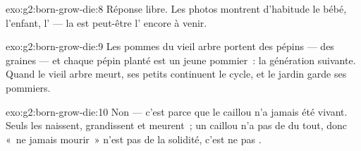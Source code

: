 \begin{solution}{exo:g2:born-grow-die:8}
Réponse libre. Les photos montrent d'habitude le bébé, l'enfant,
l' --- la  est peut-être l' encore à venir.
\end{solution}

\begin{solution}{exo:g2:born-grow-die:9}
Les pommes du vieil arbre portent des pépins --- des graines --- et
chaque pépin planté est un jeune pommier~: la génération suivante.
Quand le vieil arbre meurt, ses petits continuent le cycle, et le
jardin garde ses pommiers.
\end{solution}

\begin{solution}{exo:g2:born-grow-die:10}
Non --- c'est parce que le caillou n'a jamais été vivant. Seuls les
 naissent, grandissent et meurent~; un caillou n'a pas
de  du tout, donc «~ne jamais mourir~» n'est pas de la
solidité, c'est ne pas .
\end{solution}
